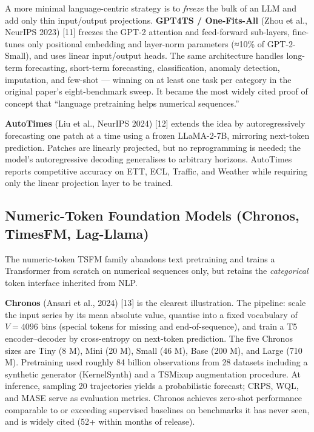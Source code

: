A more minimal language-centric strategy is to \emph{freeze} the bulk of an LLM and add only thin input/output projections. \textbf{GPT4TS / One-Fits-All} (Zhou et al., NeurIPS 2023) {[}11{]} freezes the GPT-2 attention and feed-forward sub-layers, fine-tunes only positional embedding and layer-norm parameters (≈10\% of GPT-2-Small), and uses linear input/output heads. The same architecture handles long-term forecasting, short-term forecasting, classification, anomaly detection, imputation, and few-shot --- winning on at least one task per category in the original paper's eight-benchmark sweep. It became the most widely cited proof of concept that ``language pretraining helps numerical sequences.''

\textbf{AutoTimes} (Liu et al., NeurIPS 2024) {[}12{]} extends the idea by autoregressively forecasting one patch at a time using a frozen LLaMA-2-7B, mirroring next-token prediction. Patches are linearly projected, but no reprogramming is needed; the model's autoregressive decoding generalises to arbitrary horizons. AutoTimes reports competitive accuracy on ETT, ECL, Traffic, and Weather while requiring only the linear projection layer to be trained.

\subsection{Numeric-Token Foundation Models (Chronos, TimesFM, Lag-Llama)}\label{numeric-token-foundation-models-chronos-timesfm-lag-llama}

The numeric-token TSFM family abandons text pretraining and trains a Transformer from scratch on numerical sequences only, but retains the \emph{categorical} token interface inherited from NLP.

\textbf{Chronos} (Ansari et al., 2024) {[}13{]} is the clearest illustration. The pipeline: scale the input series by its mean absolute value, quantise into a fixed vocabulary of \(V=4096\) bins (special tokens for missing and end-of-sequence), and train a T5 encoder--decoder by cross-entropy on next-token prediction. The five Chronos sizes are Tiny (8 M), Mini (20 M), Small (46 M), Base (200 M), and Large (710 M). Pretraining used roughly 84 billion observations from 28 datasets including a synthetic generator (KernelSynth) and a TSMixup augmentation procedure. At inference, sampling 20 trajectories yields a probabilistic forecast; CRPS, WQL, and MASE serve as evaluation metrics. Chronos achieves zero-shot performance comparable to or exceeding supervised baselines on benchmarks it has never seen, and is widely cited (52+ within months of release).

